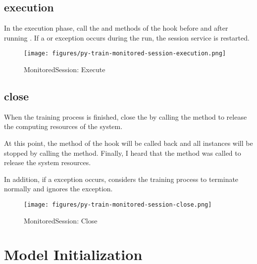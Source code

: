 \begin{content}
\subsection{execution}

In the execution phase, call the  and  methods of the hook before and after running . If a  or  exception occurs during the run, the session service is restarted.

\begin{figure}[!htbp]
\centering
\texttt{[image: figures/py-train-monitored-session-execution.png]}
\caption{MonitoredSession: Execute}
 \label{fig:py-train-monitored-session-execution}
\end{figure}

\subsection{close}

When the training process is finished, close the  by calling the  method to release the computing resources of the system.

At this point, the  method of the hook will be called back and all  instances will be stopped by calling the  method. Finally, I heard that the  method was called to release the system resources.

In addition, if a  exception occurs,  considers the training process to terminate normally and ignores the exception.

\begin{figure}[!htbp]
\centering
\texttt{[image: figures/py-train-monitored-session-close.png]}
\caption{MonitoredSession: Close}
 \label{fig:py-train-monitored-session-close}
\end{figure}

\end{content}

\section{Model Initialization}

